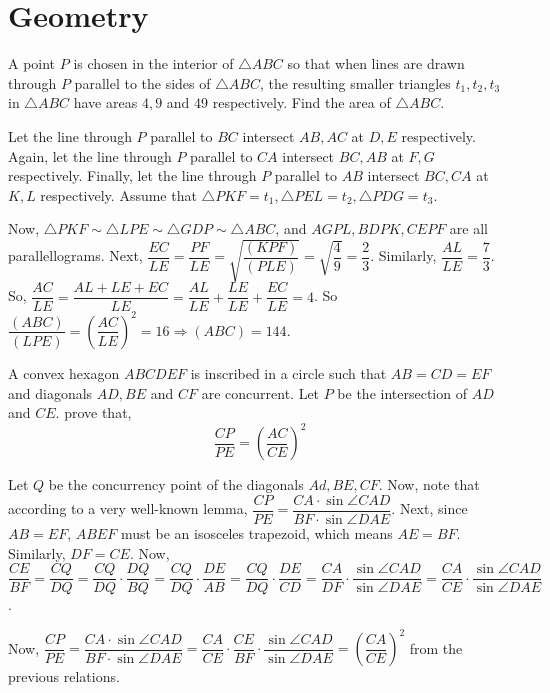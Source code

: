 \documentclass{subfile}
\begin{document}
	\section{Geometry}
	
	\begin{problem}
		A point $P$ is chosen in the interior of $\triangle ABC$ so that when lines are drawn through $P$ parallel to the sides of $\triangle ABC$, the resulting smaller triangles $t_{1},t_{2},t_{3}$ in $\triangle ABC$ have areas $4,9$ and $49$ respectively. Find the area of $\triangle ABC$.
	\end{problem}
	
	\begin{solution}
		Let the line through $P$ parallel to $BC$ intersect $AB,AC$ at $D,E$ respectively. Again, let the line through $P$ parallel to $CA$ intersect $BC,AB$ at $F,G$ respectively. Finally, let the line through $P$ parallel to $AB$ intersect $BC,CA$ at $K,L$ respectively. Assume that $\triangle PKF=t_1, \triangle PEL=t_2, \triangle PDG=t_3$. 
		
		Now, $\triangle PKF\sim \triangle LPE\sim \triangle GDP\sim \triangle ABC$, and $AGPL, BDPK, CEPF$ are all parallellograms. Next, $\dfrac{EC}{LE}=\dfrac{PF}{LE}=\sqrt{\dfrac{(KPF)}{(PLE)}}=\sqrt{\dfrac{4}{9}}=\dfrac{2}{3}$. 
		Similarly, $\dfrac{AL}{LE}=\dfrac{7}{3}$. So, $\dfrac{AC}{LE}=\dfrac{AL+LE+EC}{LE}=\dfrac{AL}{LE}+\dfrac{LE}{LE}+\dfrac{EC}{LE}=4$. So $\dfrac{(ABC)}{(LPE)}=(\dfrac{AC}{LE})^2=16\Rightarrow (ABC)=144$. 
	\end{solution}
	
	\newpage
	\begin{problem}
		A convex hexagon $ABCDEF$ is inscribed in a circle such that $AB=CD=EF$ and diagonals $AD,BE$ and $CF$ are concurrent. Let $P$ be the intersection of $AD$ and $CE$. prove that,
		\[\dfrac{CP}{PE}=(\dfrac{AC}{CE})^2\]
	\end{problem}
	
	\begin{solution}
		Let $Q$ be the concurrency point of the diagonals $Ad,BE,CF$. Now, note that according to a very well-known lemma, $\dfrac{CP}{PE}=\dfrac{CA\cdot \sin \angle CAD}{BF\cdot \sin \angle DAE}$. Next, since $AB=EF$, $ABEF$ must be an isosceles trapezoid, which means $AE=BF$. Similarly, $DF=CE$. Now, $\dfrac{CE}{BF}=\dfrac{CQ}{DQ}=\dfrac{CQ}{DQ}\cdot \dfrac{DQ}{BQ}=\dfrac{CQ}{DQ}\cdot \dfrac{DE}{AB}=\dfrac{CQ}{DQ}\cdot \dfrac{DE}{CD}=\dfrac{CA}{DF}\cdot \dfrac{\sin \angle CAD}{\sin \angle DAE}=\dfrac{CA}{CE}\cdot \dfrac{\sin \angle CAD}{\sin \angle DAE}$. 
		
		Now, $\dfrac{CP}{PE}=\dfrac{CA\cdot \sin \angle CAD}{BF\cdot \sin \angle DAE}=\dfrac{CA}{CE}\cdot \dfrac{CE}{BF}\cdot \dfrac{\sin \angle CAD}{\sin \angle DAE}=(\dfrac{CA}{CE})^{2}$ from the previous relations.
	\end{solution}
	
\end{document}
